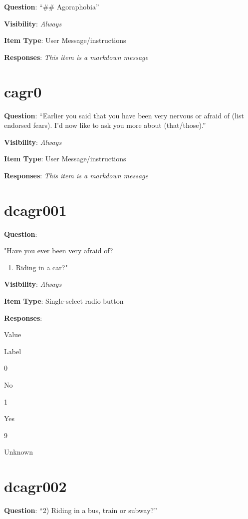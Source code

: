 \documentclass[]{book}
\providecommand{\tightlist}{%
  \setlength{\itemsep}{0pt}\setlength{\parskip}{0pt}}
\begin{document}
\textbf{Question}: ``\#\# Agoraphobia''

\textbf{Visibility}: \emph{Always}

\textbf{Item Type}: User Message/instructions

\textbf{Responses}: \emph{This item is a markdown message}

\hypertarget{cagr0}{%
\section{cagr0}\label{cagr0}}

\textbf{Question}: ``Earlier you said that you have been very nervous or afraid of (list endorsed fears). I'd now like to ask you more about (that/those).''

\textbf{Visibility}: \emph{Always}

\textbf{Item Type}: User Message/instructions

\textbf{Responses}: \emph{This item is a markdown message}

\hypertarget{dcagr001}{%
\section{dcagr001}\label{dcagr001}}

\textbf{Question}:

"Have you ever been very afraid of?

\begin{enumerate}
\def\labelenumi{\arabic{enumi})}
\tightlist
\item
  Riding in a car?"
\end{enumerate}

\textbf{Visibility}: \emph{Always}

\textbf{Item Type}: Single-select radio button

\textbf{Responses}:

Value

Label

0

No

1

Yes

9

Unknown

\hypertarget{dcagr002}{%
\section{dcagr002}\label{dcagr002}}

\textbf{Question}: ``2) Riding in a bus, train or subway?''
\end{document}
